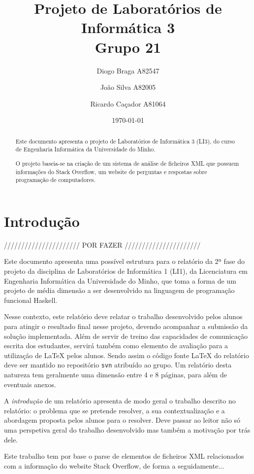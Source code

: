 \documentclass[a4paper]{article}
\title{Projeto de Laboratórios de Informática 3\\Grupo 21}
\author{Diogo Braga A82547 \and João Silva A82005 \and Ricardo Caçador A81064}
\date{\today}
\begin{document}
\maketitle

\begin{abstract}
  Este documento apresenta o projeto de Laboratórios de Informática
  3 (LI3), do curso de Engenharia Informática da Universidade
  do Minho.

  O projeto baseia-se na criação de um sistema de análise de ficheiros 
  XML que possuem informações do Stack Overflow, um website de perguntas
  e respostas sobre programação de computadores.

\end{abstract}

\tableofcontents

\section{Introdução}
\label{sec:intro}

////////////////////// POR FAZER //////////////////////

Este documento apresenta uma possível estrutura para o relatório da 2ª
fase do projeto da disciplina de Laboratórios de Informática 1 (LI1),
da Licenciatura em Engenharia Informática da Universidade do Minho,
que toma a forma de um projeto de média dimensão a ser desenvolvido na
linguagem de programação funcional Haskell.

Nesse contexto, este relatório deve relatar o trabalho desenvolvido
pelos alunos para atingir o resultado final nesse projeto, devendo
acompanhar a submissão da solução implementada. Além de servir de
treino das capacidades de comunicação escrita dos estudantes, servirá
também como elemento de avaliação para a utilização de \LaTeX{} pelos
alunos. Sendo assim o código fonte \LaTeX{} do relatório deve ser
mantido no repositório \texttt{svn} atribuído ao grupo. Um relatório desta
natureza tem geralmente uma dimensão entre 4 e 8 páginas, para além de
eventuais anexos.

A \emph{introdução} de um relatório apresenta de modo geral o trabalho
descrito no relatório: o problema que se pretende resolver, a sua
contextualização e a abordagem proposta pelos alunos para o
resolver. Deve passar ao leitor não só uma perspetiva geral do
trabalho desenvolvido mas também a motivação por trás dele.

Este trabalho tem por base o parse de elementos de ficheiros XML
relacionados com a informação do website Stack Overflow, de forma
a seguidamente...
\end{document}
